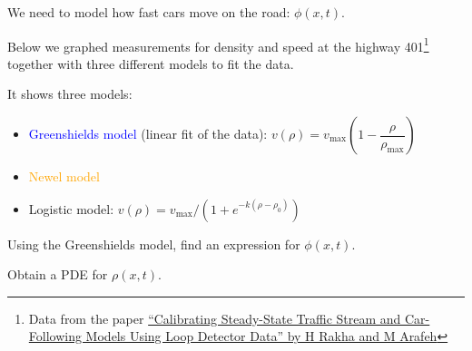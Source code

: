 \begin{slide}


We need to model how fast cars move on the road: $\phi(x,t)$.

Below we graphed measurements for density and speed at the highway 401\footnote{Data from the paper \href{https://doi.org/10.1287/trsc.1090.0297}{``Calibrating Steady-State Traffic Stream and Car-Following Models Using Loop Detector Data'' by H Rakha and M Arafeh}} together with three different models to fit the data.
\begin{center}
\end{center}

It shows three models:
\begin{itemize}
	\item[\textcolor{blue}{\textbullet}] \textcolor{blue}{Greenshields model} (linear fit of the data): $v(\rho) = v_{\max} \left(1 - \dfrac{\rho}{\rho_{\max}}\right)$
	\item[\textcolor{orange}{\textbullet}] \textcolor{orange}{Newel model}
	\item[\textcolor{black!60!green}{\textbullet}] \textcolor{black!60!green}{Logistic model}: $v(\rho) = v_{\max} / \left(1+ e^{-k(\rho - \rho_0)}\right)$
\end{itemize}

\begin{parts}
\setcounter{partsitem}{3}
	\item Using the Greenshields model, find an expression for $\phi(x,t)$.	
	\item Obtain a PDE for $\rho(x,t)$.
\end{parts}

	
\end{slide}


